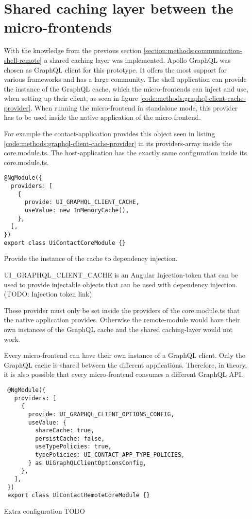 \section{Shared caching layer between the micro-frontends}

With the knowledge from the previous section \ref{section:methods:communication-shell-remote} a shared caching layer was implemented. Apollo GraphQL was chosen as GraphQL client for this prototype. It offers the most support for various frameworks and has a large community. The shell application can provide the instance of the GraphQL cache, which the micro-frontends can inject and use, when setting up their client, as seen in figure \ref{code:methods:graphql-client-cache-provider}. When running the micro-frontend in standalone mode, this provider has to be used inside the native application of the micro-frontend.

For example the contact-application provides this object seen in listing \ref{code:methods:graphql-client-cache-provider} in its providers-array inside the core.module.ts. The host-application has the exactly same configuration inside its core.module.ts.

\ifshowListings
\begin{listing}[H]
\begin{verbatim}
@NgModule({
  providers: [
    {
      provide: UI_GRAPHQL_CLIENT_CACHE,
      useValue: new InMemoryCache(),
    },
  ],
})
export class UiContactCoreModule {}
\end{verbatim}
\caption{Provide the instance of the cache to dependency injection.}\label{code:methods:graphql-client-cache-provider}
\end{listing}
\fi

UI\_GRAPHQL\_CLIENT\_CACHE is an Angular Injection-token that can be used to provide injectable objects that can be used with dependency injection. (TODO: Injection token link)

These provider must only be set inside the providers of the core.module.ts that the native application provides. Otherwise the remote-module would have their own instances of the GraphQL cache and the shared caching-layer would not work.

Every micro-frontend can have their own instance of a GraphQL client. Only the GraphQL cache is shared between the different applications. Therefore, in theory, it is also possible that every micro-frontend consumes a different GraphQL API.

\ifshowListings
\begin{listing}[H]
\begin{verbatim}
 @NgModule({
   providers: [
     {
       provide: UI_GRAPHQL_CLIENT_OPTIONS_CONFIG,
       useValue: {
         shareCache: true,
         persistCache: false,
         useTypePolicies: true,
         typePolicies: UI_CONTACT_APP_TYPE_POLICIES,
       } as UiGraphQLClientOptionsConfig,
     },
   ],
 })
 export class UiContactRemoteCoreModule {}
\end{verbatim}
\caption{Extra configuration TODO}\label{code:methods:graphql-client-extra-configuration-options}
\end{listing}
\fi


